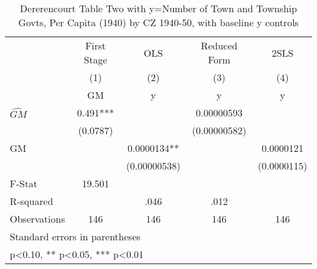 \begin{table}[htbp]\centering
\def\sym#1{\ifmmode^{#1}\else\(^{#1}\)\fi}
\caption{Dererencourt Table Two with y=Number of Town and Township Govts, Per Capita (1940) by CZ 1940-50, with baseline y controls}
\begin{tabular}{l*{4}{c}}
\toprule
                    & First Stage   &         OLS   &Reduced Form   &        2SLS   \\
                    &\multicolumn{1}{c}{(1)}&\multicolumn{1}{c}{(2)}&\multicolumn{1}{c}{(3)}&\multicolumn{1}{c}{(4)}\\
                    &\multicolumn{1}{c}{GM}&\multicolumn{1}{c}{y}&\multicolumn{1}{c}{y}&\multicolumn{1}{c}{y}\\
\midrule
$\hat{GM}$          &       0.491***&               &  0.00000593   &               \\
                    &    (0.0787)   &               &(0.00000582)   &               \\
\addlinespace
GM                  &               &   0.0000134** &               &   0.0000121   \\
                    &               &(0.00000538)   &               & (0.0000115)   \\
\midrule
F-Stat              &      19.501   &               &               &               \\
R-squared           &               &        .046   &        .012   &               \\
Observations        &         146   &         146   &         146   &         146   \\
\bottomrule
\multicolumn{5}{l}{\footnotesize Standard errors in parentheses}\\
\multicolumn{5}{l}{\footnotesize * p<0.10, ** p<0.05, *** p<0.01}\\
\end{tabular}
\end{table}
